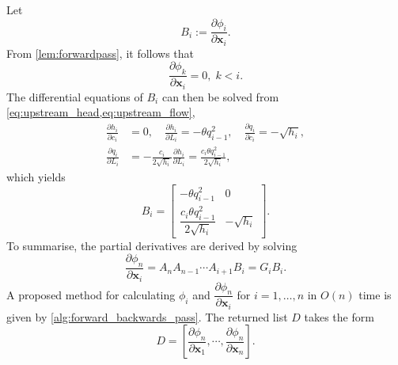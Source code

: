Let
\begin{equation*}
    B_i:=\frac{\partial \phi_i}{\partial \mathbf{x}_i}.
\end{equation*}
From \autoref{lem:forwardpass}, it follows that
\begin{equation*}
    \frac{\partial \phi_k}{\partial \mathbf{x}_i} = 0,\; k<i.
\end{equation*}
The differential equations of $B_i$ can then be solved from \cref{eq:upstream_head,eq:upstream_flow},
\begin{align*}
    \frac{\partial h_i}{\partial c_i} &= 0, \quad
    \frac{\partial h_i}{\partial L_i} = -\theta q_{i-1}^2, \quad
    \frac{\partial q_i}{\partial c_i} = -\sqrt{h_i}, \\
    \frac{\partial q_i}{\partial L_i} &= - \frac{c_i}{2\sqrt{h_i}} \frac{\partial h_i}{\partial L_i} = 
    \frac{c_i \theta q_{i-1}^2}{2 \sqrt{h_i}}, 
\end{align*}
which yields
\begin{equation}
\label{eq:B_i}
B_i=\begin{bmatrix}
    -\theta q_{i-1}^2 & 0 \\[0.4em]
    \dfrac{c_i \theta q_{i-1}^2}{2 \sqrt{h_i}} & -\sqrt{h_i}
\end{bmatrix}.
\end{equation}
To summarise, the partial derivatives are derived by solving
\begin{equation*}
    \frac{\partial \phi_{n}}{\partial \mathbf{x}_i} =
     A_n A_{n-1} \cdots A_{i+1} B_i =
    G_i B_i.
\end{equation*}
A proposed method for calculating $\phi_i$ and $\dfrac{\partial \phi_n}{\partial \mathbf{x}_i}$ for $i = 1,\dots,n$ in $O(n)$ time is given by \autoref{alg:forward_backwards_pass}. 
The returned list $D$ takes the form
\begin{equation*}
    D = \left[\frac{\partial \phi_n}{\partial \mathbf{x}_1}, \cdots ,\frac{\partial \phi_n}{\partial \mathbf{x}_n} \right].
\end{equation*}



